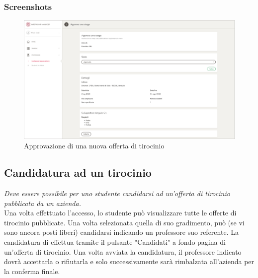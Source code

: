 \subsubsection{Screenshots}
\begin{figure}[H]
	\centering
	\includegraphics[width=1\textwidth]{Figs/screenshots/internshipapprove}     
	\caption[Screenshot: approvazione di una nuova offerta di tirocinio]{Approvazione di una nuova offerta di tirocinio}
	\label{fig:screenshot:3}
\end{figure}

\pagebreak
\subsection{Candidatura ad un tirocinio}

\textit{Deve essere possibile per uno studente candidarsi ad un'offerta di tirocinio pubblicata da un azienda.} \\

\noindent
Una volta effettuato l'accesso, lo studente può visualizzare tutte le offerte di tirocinio pubblicate. Una volta selezionata quella di suo gradimento, può (se vi sono ancora posti liberi) candidarsi indicando un professore suo referente. La candidatura di effettua tramite il pulsante "Candidati" a fondo pagina di un'offerta di tirocinio. Una volta avviata la candidatura, il professore indicato dovrà accettarla o rifiutarla e solo successivamente sarà rimbalzata all'azienda per la conferma finale.

